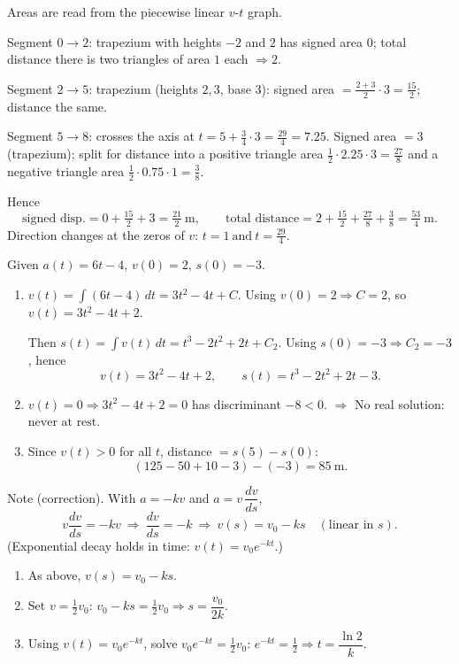 \documentclass[11pt]{article}
\def\textit#1{#1}%
\begin{document}
\begin{solution}
Areas are read from the piecewise linear \(v\)-\(t\) graph.

Segment \(0\to2\): trapezium with heights \(-2\) and \(2\) has signed area \(0\);
total distance there is two triangles of area \(1\) each \(\Rightarrow 2\).

Segment \(2\to5\): trapezium (heights \(2,3\), base \(3\)):
signed area \(=\frac{2+3}{2}\cdot3=\tfrac{15}{2}\); distance the same.

Segment \(5\to8\): crosses the axis at 
\(t=\displaystyle 5+\frac{3}{4}\cdot3=\boxed{\tfrac{29}{4}=7.25}\).
Signed area \(=3\) (trapezium); split for distance into 
a positive triangle area \(\tfrac12\cdot2.25\cdot3=\tfrac{27}{8}\)
and a negative triangle area \(\tfrac12\cdot0.75\cdot1=\tfrac{3}{8}\).

Hence
\[
\text{signed disp.}=0+\tfrac{15}{2}+3=\boxed{\tfrac{21}{2}\ \text{m}},
\qquad
\text{total distance}=2+\tfrac{15}{2}+\tfrac{27}{8}+\tfrac{3}{8}
=\boxed{\tfrac{53}{4}\ \text{m}}.
\]
Direction changes at the zeros of \(v\): \(\boxed{t=1\ \text{and}\ t=\tfrac{29}{4}}\).
\end{solution}

\begin{solution}
Given \(a(t)=6t-4\), \(v(0)=2\), \(s(0)=-3\).
\begin{enumerate}
\item \(v(t)=\int (6t-4)\,dt=3t^{2}-4t+C\).
Using \(v(0)=2\Rightarrow C=2\), so \(v(t)=3t^{2}-4t+2\).

Then \(s(t)=\int v(t)\,dt=t^{3}-2t^{2}+2t+C_2\).
Using \(s(0)=-3\Rightarrow C_2=-3\), hence
\[
\boxed{v(t)=3t^{2}-4t+2},\qquad \boxed{s(t)=t^{3}-2t^{2}+2t-3}.
\]
\item \(v(t)=0\Rightarrow 3t^{2}-4t+2=0\) has discriminant \(-8<0\).
\(\Rightarrow\) No real solution: \(\boxed{\text{never at rest}}\).
\item Since \(v(t)>0\) for all \(t\), distance \(=s(5)-s(0)\):
\[
(125-50+10-3)-(-3)=\boxed{85\ \text{m}}.
\]
\end{enumerate}
\end{solution}

\begin{solution}
\textit{Note (correction).} With \(a=-kv\) and \(a=v\,\dfrac{dv}{ds}\),
\[
v\frac{dv}{ds}=-kv \ \Rightarrow\ \frac{dv}{ds}=-k
\ \Rightarrow\ \boxed{v(s)=v_0-ks}\quad(\text{linear in }s).
\]
(Exponential decay holds in time: \( \displaystyle v(t)=v_0e^{-kt}\).)
\begin{enumerate}
\item As above, \(v(s)=v_0-ks\).
\item Set \(v=\tfrac{1}{2}v_0\): \(v_0-ks=\tfrac{1}{2}v_0\Rightarrow
\boxed{s=\dfrac{v_0}{2k}}.\)
\item Using \(v(t)=v_0e^{-kt}\), solve \(v_0e^{-kt}=\tfrac12 v_0\):
\(e^{-kt}=\tfrac12\Rightarrow \boxed{t=\dfrac{\ln 2}{k}}.\)
\end{enumerate}
\end{solution}
\end{document}
